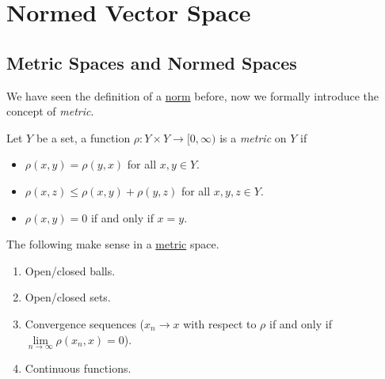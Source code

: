 \chapter{Normed Vector Space}\label{ch:Normed-Vector-Space}
\section{Metric Spaces and Normed Spaces}
We have seen the definition of a \hyperref[def:norm]{norm} before, now we formally introduce the concept of \emph{metric}.
\begin{definition}[Metric]\label{def:metric}
	Let \(Y\) be a set, a function \(\rho \colon Y\times Y\to [0, \infty )\) is a \emph{metric} on \(Y\) if
	\begin{itemize}
		\item \(\rho (x, y) = \rho (y, x)\) for all \(x, y\in Y\).
		\item \(\rho (x, z) \leq \rho (x, y) + \rho (y, z)\) for all \(x, y, z\in Y\).
		\item \(\rho (x, y) = 0\) if and only if \(x = y\).
	\end{itemize}
\end{definition}

\begin{note}
	The following make sense in a \hyperref[def:metric]{metric} space.
	\begin{enumerate}[(1)]
		\item Open/closed balls.
		\item Open/closed sets.
		\item Convergence sequences (\(x_{n} \to x\) with respect to \(\rho \) if and only if \(\lim\limits_{n \to \infty} \rho (x_{n} , x) = 0\)).
		\item Continuous functions.
	\end{enumerate}
\end{note}

